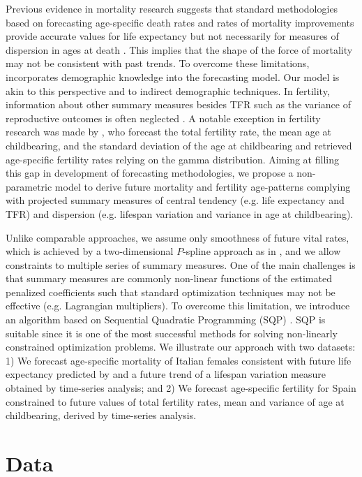 \documentclass[12pt,a4paper,twoside]{article}
\begin{document}
Previous evidence in mortality research suggests that standard methodologies based on forecasting age-specific death rates and rates of mortality improvements provide accurate values for life expectancy but not necessarily for measures of dispersion in ages at death \citep{bohk2017lifespan}. This implies that the shape of the force of mortality may not be consistent with past trends. To overcome these limitations, \citet{camarda2019smooth} incorporates demographic knowledge into the forecasting model. Our model is akin to this perspective and to indirect demographic techniques. In fertility, information about other summary measures besides TFR such as the variance of reproductive outcomes is often neglected \citep{hruschka2016does}. A notable exception in fertility research was made by \citet{thompson1989multivariate}, who forecast the total fertility rate, the mean age at childbearing, and the standard deviation of the age at childbearing and retrieved age-specific fertility rates relying on the gamma distribution. Aiming at filling this gap in development of forecasting methodologies, we propose a non-parametric model to derive future mortality and fertility age-patterns complying with projected summary measures of central tendency (e.g. life expectancy and TFR) and dispersion (e.g. lifespan variation and variance in age at childbearing). 

Unlike comparable approaches, we assume only smoothness of future vital rates, which is achieved by a two-dimensional $P$-spline approach as in \citet{currie2004smoothing}, and we allow constraints to multiple series of summary measures. One of the main challenges is that summary measures are commonly non-linear functions of the estimated penalized coefficients such that standard optimization techniques may not be effective (e.g. Lagrangian multipliers). To overcome this limitation, we introduce an algorithm based on Sequential Quadratic Programming (SQP) \citep{nocedal2006sequential}. SQP is suitable since it is one of the most successful methods for solving non-linearly constrained optimization problems. We illustrate our approach with two datasets: 1) We forecast age-specific mortality of Italian females consistent with future life expectancy predicted by \citet{UN2019} and a future trend of a lifespan variation measure obtained by time-series analysis; and 2) We forecast age-specific fertility for Spain constrained to future values of total fertility rates, mean and variance of age at childbearing, derived by time-series analysis.

\section{Data}
\end{document}
